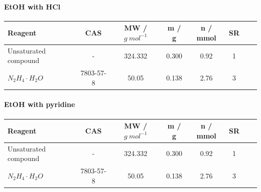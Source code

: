 \documentclass[../Master.tex]{subfiles}
\begin{document}
\paragraph{EtOH with HCl}

\begin{center}
	\begin{tabular}[b]{lccccccc}
		\toprule
		Reagent               & CAS       & MW / \(g \ mol^{-1}\) & m / g & n / mmol & SR \\
		\midrule
		Unsaturated compound  & -         & 324.332               & 0.300 & 0.92     & 1  \\
		\(N_2H_4 \cdot H_2O\) & 7803-57-8 & 50.05                 & 0.138 & 2.76     & 3  \\
		\bottomrule
	\end{tabular}
\end{center}



\paragraph{EtOH with pyridine}

\begin{center}
	\begin{tabular}[b]{lccccccc}
		\toprule
		Reagent               & CAS       & MW / \(g \ mol^{-1}\) & m / g & n / mmol & SR \\
		\midrule
		Unsaturated compound  & -         & 324.332               & 0.300 & 0.92     & 1  \\
		\(N_2H_4 \cdot H_2O\) & 7803-57-8 & 50.05                 & 0.138 & 2.76     & 3  \\
		\bottomrule
	\end{tabular}
\end{center}
\end{document}
